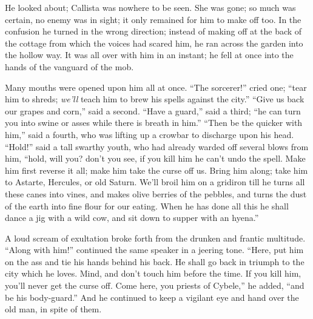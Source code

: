He looked about; Callista was nowhere to be seen. She was gone; so
much was certain, no enemy was in sight; it only remained for him to
make off too. In the confusion he turned in the wrong direction;
instead of making off at the back of the cottage from which the voices
had scared him, he ran across the garden into the hollow way. It
was all over with him in an instant; he fell at once into the hands of
the vanguard of the mob.

Many mouths were opened upon him all at once. ``The
sorcerer!'' cried one; ``tear him to shreds; \emph{we'll}
teach him to brew his spells against the city.'' ``Give us
back our grapes and corn,'' said a second. ``Have a
guard,'' said a third; ``he can turn you into swine or asses
while there is breath in him.'' ``Then be the quicker with
him,'' said a fourth, who was lifting up a crowbar to discharge
upon his head. ``Hold!'' said a tall swarthy youth, who had
already warded off several blows from him, ``hold, will you? don't
you see, if you kill him he can't undo the spell. Make him first
reverse it all; make him take the curse off us. Bring him along; take
him to Astarte, Hercules, or old Saturn. We'll broil him on a gridiron
till he turns all these canes into vines, and makes olive berries of
the pebbles, and turns the dust of the earth into fine flour for our
eating. When he has done all this he shall dance a jig with a wild
cow, and sit down to supper with an hyena.''

A loud scream of exultation broke forth from the drunken and
frantic multitude. ``Along with him!'' continued the same
speaker in a jeering tone. ``Here, put him on the ass and tie his
hands behind his back. He shall go back in triumph to the city which
he loves. Mind, and don't touch him before the time. If you kill him,
you'll never get the curse off. Come here, you priests of Cybele,''
he added, ``and be his body-guard.'' And he continued to
keep a vigilant eye and hand over the old man, in spite of them.

